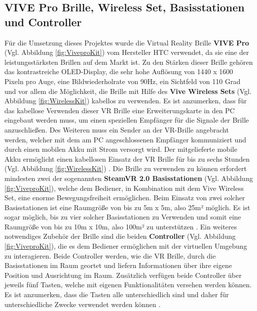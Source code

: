 \subsection{VIVE Pro Brille, Wireless Set, Basisstationen und Controller}\label{sec:GrundHardware}
Für die Umsetzung dieses Projektes wurde die Virtual Reality Brille \textbf{VIVE Pro} (Vgl. Abbildung \ref{fig:ViveproKit}) vom Hersteller HTC verwendet, da sie eine der leistungsstärksten Brillen auf dem Markt ist. Zu den Stärken dieser Brille gehören das kontrastreiche OLED-Display, die sehr hohe Auflösung von 1440 x 1600 Pixeln pro Auge, eine Bildwiederholrate von 90Hz, ein Sichtfeld von 110 Grad und vor allem die Möglichkeit, die Brille mit Hilfe des \textbf{Vive Wireless Sets} (Vgl. Abbildung \ref{fig:WirelessKit}) kabellos zu verwenden. Es ist anzumerken, dass für das kabellose Verwenden dieser VR Brille eine Erweiterungskarte in den PC eingebaut werden muss, um einen speziellen Empfänger für die Signale der Brille anzuschließen. Des Weiteren muss ein Sender an der VR-Brille angebracht werden, welcher mit dem am PC angeschlossenen Empfänger kommuniziert und durch einen mobilen Akku mit Strom versorgt wird. Der mitgelieferte mobile Akku ermöglicht einen kabellosen Einsatz der VR Brille für bis zu sechs Stunden (Vgl. Abbildung \ref{fig:WirelessKit}) \cite{28}.
\newline
Die Brille zu verwenden zu können erfordert mindesten zwei der sogenannten \textbf{SteamVR 2.0 Basisstationen} (Vgl. Abbildung \ref{fig:ViveproKit}), welche dem Bediener, in Kombination mit dem Vive Wireless Set, eine enorme Bewegungsfreiheit ermöglichen. Beim Einsatz von zwei solcher Basisstationen ist eine Raumgröße von bis zu 5m x 5m, also 25m² möglich. Es ist sogar möglich, bis zu vier solcher Basisstationen zu Verwenden und somit eine Raumgröße von bis zu 10m x 10m, also 100m² zu unterstützen \cite{28}.
\newline
Ein weiteres notwendiges Zubehör der Brille sind die beiden \textbf{Controller} (Vgl. Abbildung \ref{fig:ViveproKit}), die es dem Bediener ermöglichen mit der virtuellen Umgebung zu interagieren. Beide Controller werden, wie die VR Brille, durch die Basisstationen im Raum geortet und liefern Informationen über ihre eigene Position und Ausrichtung im Raum. Zusätzlich verfügen beide Controller über jeweils fünf Tasten, welche mit eigenen Funktionalitäten versehen werden können. Es ist anzumerken, dass die Tasten alle unterschiedlich sind und daher für unterschiedliche Zwecke verwendet werden können \cite{29}.
\newline
